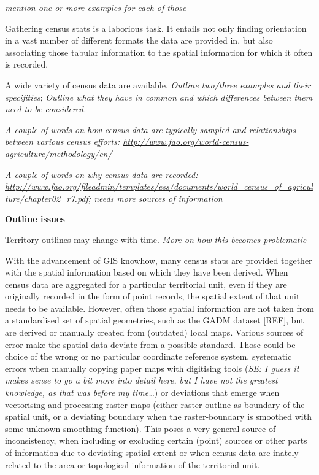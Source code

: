 \documentclass[12pt,]{article}
\begin{document}
\emph{mention one or more examples for each of those}

Gathering census stats is a laborious task.
It entails not only finding orientation in a vast number of different formats the data are provided in, but also associating those tabular information to the spatial information for which it often is recorded.

A wide variety of census data are available. \emph{Outline two/three examples and their specifities}; \emph{Outline what they have in common and which differences between them need to be considered.}

\emph{A couple of words on how census data are typically sampled and relationships between various census efforts: \url{http://www.fao.org/world-census-agriculture/methodology/en/}}

\emph{A couple of words on why census data are recorded: \url{http://www.fao.org/fileadmin/templates/ess/documents/world_census_of_agriculture/chapter02_r7.pdf}; needs more sources of information}

\textbf{Outline issues}

Territory outlines may change with time. \emph{More on how this becomes problematic}

With the advancement of GIS knowhow, many census stats are provided together with the spatial information based on which they have been derived.
When census data are aggregated for a particular territorial unit, even if they are originally recorded in the form of point records, the spatial extent of that unit needs to be available.
However, often those spatial information are not taken from a standardised set of spatial geometries, such as the GADM dataset {[}REF{]}, but are derived or manually created from (outdated) local maps.
Various sources of error make the spatial data deviate from a possible standard.
Those could be choice of the wrong or no particular coordinate reference system, systematic errors when manually copying paper maps with digitising tools (\emph{SE: I guess it makes sense to go a bit more into detail here, but I have not the greatest knowledge, as that was before my time\ldots{}}) or deviations that emerge when vectorising and processing raster maps (either raster-outline as boundary of the spatial unit, or a deviating boundary when the raster-boundary is smoothed with some unknown smoothing function). This poses a very general source of inconsistency, when including or excluding certain (point) sources or other parts of information due to deviating spatial extent or when census data are inately related to the area or topological information of the territorial unit.
\end{document}
